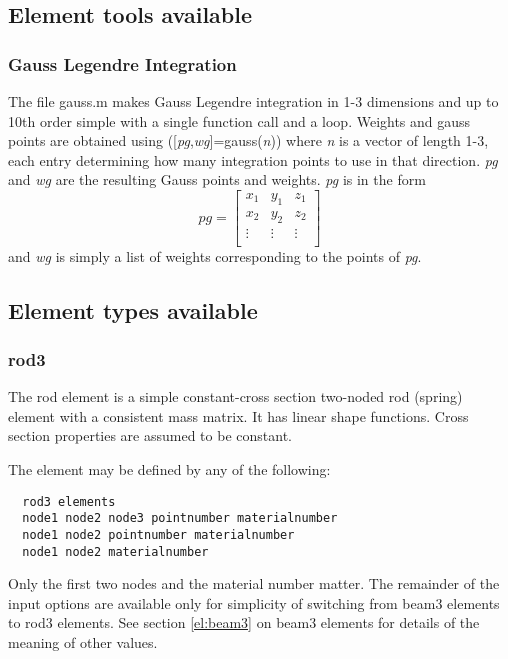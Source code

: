 \documentclass[12pt]{article}
\newcommand*{\sarg}[1]{\textit{#1}}
\newcommand*{\command}[1]{\textsf{#1}}
\begin{document}
\subsection{Element tools available}
\subsubsection{Gauss Legendre Integration}
The file \textsf{gauss.m} makes Gauss Legendre integration in 1-3
dimensions and up to 10th order simple with a single function call and
a loop. Weights and gauss points are obtained using
\command{([}\sarg{pg}\command{,}\sarg{wg}\command{]=gauss(}\sarg{n}\command{))}
where \sarg{n} is a vector of length 1-3, each entry determining how
many integration points to use in that direction. \sarg{pg} and
\sarg{wg} are the resulting Gauss points and weights. \sarg{pg} is in
the form
\begin{displaymath}
pg=\begin{bmatrix}
x_{1}&y_{1}&z_{1}\\
x_{2}&y_{2}&z_{2}\\
\vdots&\vdots&\vdots\\
\end{bmatrix}
\end{displaymath}and \sarg{wg} is simply a list of weights corresponding to the points of \sarg{pg}.
\subsection{Element types available}

\subsubsection{\command{rod3}}\label{el:rod3}
The \command{rod} element is a simple constant-cross section two-noded rod (spring) element with a consistent mass matrix.  It has linear shape functions. Cross section properties are assumed to be constant.

The element may be defined by any of the following:\\
\begin{lstlisting}
  rod3 elements
  node1 node2 node3 pointnumber materialnumber
  node1 node2 pointnumber materialnumber
  node1 node2 materialnumber
\end{lstlisting}
Only the first two nodes and the material number matter. The remainder of the input options are available only for simplicity of switching from \command{beam3} elements to \command{rod3} elements. See section \ref{el:beam3} on \command{beam3} elements for details of the meaning of other values.
\end{document}
